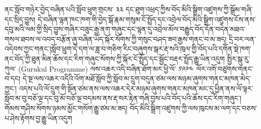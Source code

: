 \documentclass{article}
\begin{document}
ནང་སློབ་གཉེར་བྱེད་བཞིན་པའི་སློབ་ཕྲུག་གྲངས་ ༣༣ དང་ཐུག་འཕྲད་ཀྱིས་བོད་མིའི་སྒྲིག་འཛུགས་ཀྱི་སྒྲོམ་གཞི་དང་སྲིད་བྱུས། དེ་བཞིན་ལྷན་ཁང་ཁག་གི་བྱེད་སྒོ་རྣམ་གསུམ་ངོ་སྤྲོད་དང་འབྲེལ་བོད་མིའི་སྒྲིག་འཛུགས་ངོས་ནས་དབུ་མའི་ལམ་གྱི་སྲིད་བྱུས་གཞིར་བཟུང་རྒྱ་ནག་གཞུང་དང་ལྷན་དུ་འབྲེལ་མོལ་བརྒྱུད་བོད་དོན་བདེན་མཐའ་གསལ་ཐབས་ལ་འབད་བརྩོན་ཞུ་བཞིན་ཡོད་སྐོར་སོགས་ཀྱི་གསུང་བཤད་ཟབ་རྒྱས་གནང་བ་མ་ཟད། དྲི་བར་ལན་འདེབས་ཀྱང་གནང་།སློབ་ཕྲུག་དེ་དག་ལ་ཟླ་བ་གཅིག་རིང་བཞུགས་སྒར་རྡ་སའི་ཁུལ་གྱི་བོད་པའི་དགོན་སྡེ་ཁག་ནང་བོད་ཀྱི་ཐུན་མིན་ཆོས་དང་རིག་གཞུང་སོགས་ཀྱི་སྐོར་ངོ་སྤྲོད་དང་སྦྱོང་བརྡར་སྤྲོད་རྒྱུ་ཡིན་འདུག སྤྱིར་སྒུ་རུ་ཀུལ་ (Gurukul Programme) ལས་འཆར་འདི་བཞིན་ཐོག་མར་ཕྱི་ལོ་ ༡༩༩༤ ལོར་འགོ་བཙུགས་གནང་བ་དང། དེ་སྔ་ལས་འཆར་འདིའི་འོག་མཐོ་སློབ་ཀྱི་སློབ་མ་དྲུག་བདུན་ཙམ་ལས་མཉམ་ཞུགས་གནང་མཁན་མེད་ཀྱང་། འདས་པའི་ལོ་དྲུག་གི་སྔོན་ཙམ་ནས་ལས་འཆར་དེར་མཉམ་ཞུགས་གནང་མཁན་མང་དུ་ཕྱིན་ནས་ལོ་ལྟར་སློབ་མ་བུ་བཅོ་ལྔ་དང་བུ་མོ་བཅོ་ལྔ་བདམས་ནས་རྡ་སར་རྟེན་གཞི་བྱས་པའི་བོད་པའི་ཆོས་དང་རིག་གཞུང་། གོམས་གཤིས་སོགས་ཉམས་མྱོང་གསོག་རྒྱུ་ཙམ་མ་ཟད། བོད་མིའི་སྒྲིག་འཛུགས་ཀྱི་ལས་ཁུངས་མ་ལག་དང་བཅས་པ་ཤེས་རྟོགས་བྱ་རྒྱུ་ཡིན་འདུག
\end{document}
